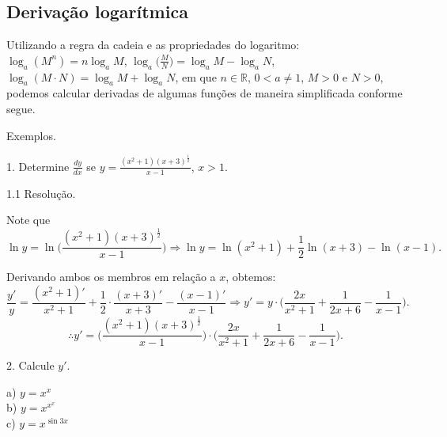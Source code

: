 \documentclass{article}
\begin{document}
{\begin{newpage}
\subsection{Derivação logarítmica}
\hspace{12pt} Utilizando a regra da cadeia e as propriedades do logaritmo: $\log_{a}{(M^n)} = n\log_{a}{M}$, $\displaystyle{\log_{a}{\Big(\frac{M}{N}\Big)} = \log_{a}{M} - \log_{a}{N}}$, $\log_{a}{(M\cdot N)} = \log_{a}{M} +\log_{a}{N}$, em que $n\in\mathbb{R}$, $0 < a\neq 1$, $M>0$ e $N>0$, podemos calcular derivadas de algumas funções de maneira simplificada conforme segue.
\vspace{0.3cm}
\par
Exemplos.
\par
\begin{flushleft}
1. Determine $\displaystyle{\frac{dy}{dx}}$ se $y=\displaystyle{\frac{(x^2 + 1)(x+3)^{\frac{1}{2}}}{x-1}}$, $x>1$.
\end{flushleft}
\vspace{0.3cm}
\begin{flushleft}
1.1 Resolução.
\end{flushleft}
\par Note que
\begin{equation*} \ln{y} = \ln{\Big(\displaystyle{\frac{(x^2 + 1)(x+3)^{\frac{1}{2}}}{x-1}}\Big)} \Rightarrow \displaystyle{\ln{y} = \ln{(x^2 + 1)} + \frac{1}{2}\ln{(x+3)} - \ln{(x-1)}} .\end{equation*}
\par
Derivando ambos os membros em relação a $x$, obtemos:
\begin{equation*} \displaystyle{\frac{y'}{y} = \frac{(x^2 + 1)'}{x^2 + 1}  + \frac{1}{2}\cdot\frac{(x+3)'}{x+3} - \frac{(x-1)'}{x-1} \Rightarrow y'=y\cdot\Big(\frac{2x}{x^2 + 1} + \frac{1}{2x+6} - \frac{1}{x-1}\Big)} .\end{equation*}
$$\therefore y'=\displaystyle{\Big(\frac{(x^2 + 1)(x+3)^{\frac{1}{2}}}{x-1}\Big)\cdot\Big(\frac{2x}{x^2 + 1} + \frac{1}{2x+6} - \frac{1}{x-1}\Big)}.$$
\par
\vspace{0.3cm}
\begin{flushleft}
2. Calcule $y'$.
\end{flushleft}
\par
\begin{multicols}{4}
\hspace{-15pt}a) $y=x^x$\\
b) $y=x^{x^x}$\\
c) $y=x^{\sin{3x}}$\\

\end{multicols}
\end{newpage}}
\end{document}
